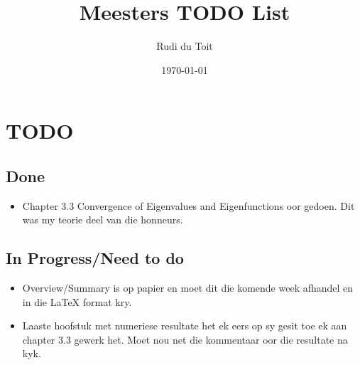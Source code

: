 \documentclass{article}
\begin{document}
\title{Meesters TODO List}
\author{Rudi du Toit}
\date{\today}
\maketitle

\section*{TODO}

\subsection*{Done}
\begin{itemize}
\item Chapter 3.3 Convergence of Eigenvalues and Eigenfunctions oor gedoen. Dit was my teorie deel van die honneurs.
\end{itemize}

\subsection*{In Progress/Need to do}
\begin{itemize}
\item Overview/Summary is op papier en moet dit die komende week afhandel en in die LaTeX format kry.
\item Laaste hoofstuk met numeriese resultate het ek eers op sy gesit toe ek aan chapter 3.3 gewerk het. Moet nou net die kommentaar oor die resultate na kyk.
\end{itemize}
\end{document}
